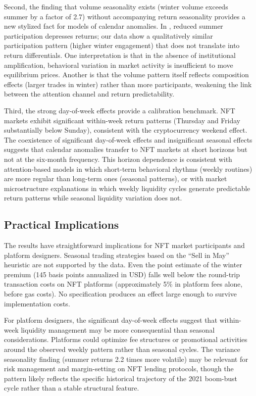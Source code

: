 \documentclass[12pt,a4paper]{article}
\begin{document}
Second, the finding that volume seasonality exists (winter volume exceeds summer by a factor of 2.7) without accompanying return seasonality provides a new stylized fact for models of calendar anomalies. In \citet{HongYu2009}, reduced summer participation depresses returns; our data show a qualitatively similar participation pattern (higher winter engagement) that does not translate into return differentials. One interpretation is that in the absence of institutional amplification, behavioral variation in market activity is insufficient to move equilibrium prices. Another is that the volume pattern itself reflects composition effects (larger trades in winter) rather than more participants, weakening the link between the attention channel and return predictability.

Third, the strong day-of-week effects provide a calibration benchmark. NFT markets exhibit significant within-week return patterns (Thursday and Friday substantially below Sunday), consistent with the cryptocurrency weekend effect. The coexistence of significant day-of-week effects and insignificant seasonal effects suggests that calendar anomalies transfer to NFT markets at short horizons but not at the six-month frequency. This horizon dependence is consistent with attention-based models in which short-term behavioral rhythms (weekly routines) are more regular than long-term ones (seasonal patterns), or with market microstructure explanations in which weekly liquidity cycles generate predictable return patterns while seasonal liquidity variation does not.

\subsection{Practical Implications}

The results have straightforward implications for NFT market participants and platform designers. Seasonal trading strategies based on the ``Sell in May'' heuristic are not supported by the data. Even the point estimate of the winter premium (145 basis points annualized in USD) falls well below the round-trip transaction costs on NFT platforms (approximately 5\% in platform fees alone, before gas costs). No specification produces an effect large enough to survive implementation costs.

For platform designers, the significant day-of-week effects suggest that within-week liquidity management may be more consequential than seasonal considerations. Platforms could optimize fee structures or promotional activities around the observed weekly pattern rather than seasonal cycles. The variance seasonality finding (summer returns 2.2 times more volatile) may be relevant for risk management and margin-setting on NFT lending protocols, though the pattern likely reflects the specific historical trajectory of the 2021 boom-bust cycle rather than a stable structural feature.
\end{document}

